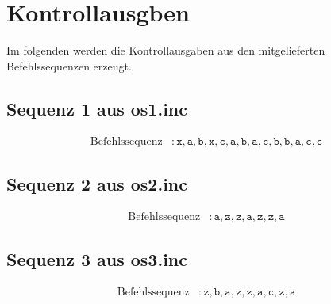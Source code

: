 \section{Kontrollausgben}
Im folgenden werden die Kontrollausgaben aus den mitgelieferten Befehlssequenzen erzeugt.


\subsection{Sequenz 1 aus os1.inc}

\begin{align*}
\text{Befehlssequenz} &: \mathtt{x,a,b,x,c,a,b,a,c,b,b,a,c,c}
\end{align*}






\subsection{Sequenz 2 aus os2.inc}
\begin{align*}
\text{Befehlssequenz} &: \mathtt{a,z,z,a,z,z,a}
\end{align*}





\subsection{Sequenz 3 aus os3.inc}

\begin{align*}
\text{Befehlssequenz} &: \mathtt{z,b,a,z,z,a,c,z,a}
\end{align*}


